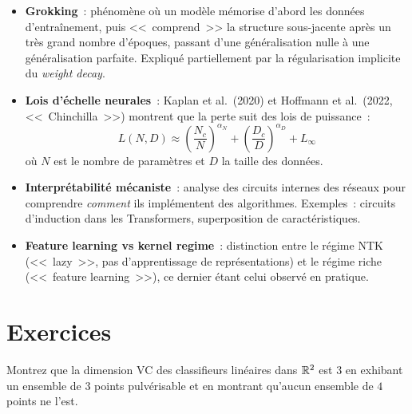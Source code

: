 \begin{sota}[title=\textbf{Th\'eorie de l'apprentissage profond en 2024--2025}]
\begin{itemize}
    \item \textbf{Grokking}~: ph\'enom\`ene o\`u un mod\`ele
          m\'emorise d'abord les donn\'ees d'entra\^inement, puis
          <<~comprend~>> la structure sous-jacente apr\`es un tr\`es
          grand nombre d'\'epoques, passant d'une g\'en\'eralisation nulle
          \`a une g\'en\'eralisation parfaite. Expliqu\'e partiellement par
          la r\'egularisation implicite du \emph{weight decay}.
    \item \textbf{Lois d'\'echelle neurales}~:
          Kaplan et al.\ (2020) et Hoffmann et al.\ (2022, <<~Chinchilla~>>)
          montrent que la perte suit des lois de puissance~:
          \begin{equation}
          L(N, D) \approx \left(\frac{N_c}{N}\right)^{\alpha_N} + \left(\frac{D_c}{D}\right)^{\alpha_D} + L_\infty
          \end{equation}
          o\`u $N$ est le nombre de param\`etres et $D$ la taille des donn\'ees.
    \item \textbf{Interpr\'etabilit\'e m\'ecaniste}~:
          analyse des circuits internes des r\'eseaux pour comprendre
          \emph{comment} ils impl\'ementent des algorithmes. Exemples~:
          circuits d'induction dans les Transformers, superposition de
          caract\'eristiques.
    \item \textbf{Feature learning vs kernel regime}~: distinction entre
          le r\'egime NTK (<<~lazy~>>, pas d'apprentissage de repr\'esentations)
          et le r\'egime riche (<<~feature learning~>>), ce dernier \'etant
          celui observ\'e en pratique.
\end{itemize}
\end{sota}

\section{Exercices}
\label{sec:theorie-exercices}

\begin{exercice}
\label{exo:vc-dim}
Montrez que la dimension VC des classifieurs lin\'eaires dans $\mathbb{R}^2$
est $3$ en exhibant un ensemble de $3$ points pulv\'erisable et en
montrant qu'aucun ensemble de $4$ points ne l'est.
\end{exercice}

